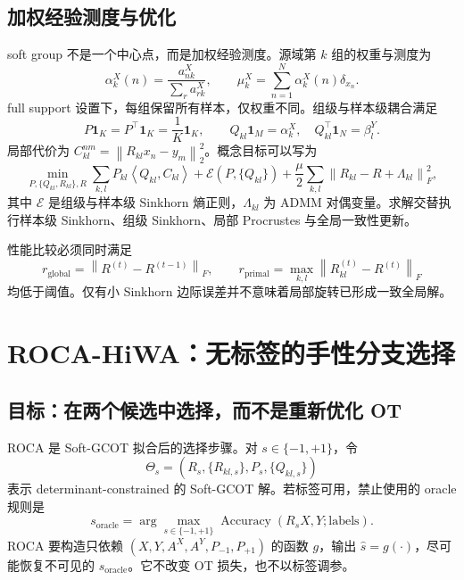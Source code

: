 \documentclass[UTF8,a4paper,11pt]{ctexart}
\newcommand{\norm}[1]{\left\lVert #1\right\rVert}
\newcommand{\inner}[2]{\left\langle #1,#2\right\rangle}
\begin{document}
\subsection{加权经验测度与优化}
soft group 不是一个中心点，而是加权经验测度。源域第 $k$ 组的权重与测度为
\begin{equation}
\alpha_k^X(n)=\frac{a_{nk}^X}{\sum_r a_{rk}^X},\qquad
\mu_k^X=\sum_{n=1}^{N}\alpha_k^X(n)\delta_{x_n}.
\end{equation}
full support 设置下，每组保留所有样本，仅权重不同。组级与样本级耦合满足
\begin{equation}
P\bm{1}_K=P^\top\bm{1}_K=\frac1K\bm{1}_K,\qquad
Q_{kl}\bm{1}_M=\alpha_k^X,\quad Q_{kl}^\top\bm{1}_N=\beta_l^Y.
\end{equation}
局部代价为 $C_{kl}^{nm}=\norm{R_{kl}x_n-y_m}_2^2$。概念目标可以写为
\begin{equation}
\min_{P,\{Q_{kl},R_{kl}\},R}
\sum_{k,l}P_{kl}\inner{Q_{kl}}{C_{kl}}+\mathcal E(P,\{Q_{kl}\})
+\frac{\mu}{2}\sum_{k,l}\norm{R_{kl}-R+\Lambda_{kl}}_F^2,
\end{equation}
其中 $\mathcal E$ 是组级与样本级 Sinkhorn 熵正则，$\Lambda_{kl}$ 为 ADMM 对偶变量。求解交替执行样本级 Sinkhorn、组级 Sinkhorn、局部 Procrustes 与全局一致性更新。

性能比较必须同时满足
\begin{equation}
r_{\mathrm{global}}=\norm{R^{(t)}-R^{(t-1)}}_F,\qquad
r_{\mathrm{primal}}=\max_{k,l}\norm{R_{kl}^{(t)}-R^{(t)}}_F
\end{equation}
均低于阈值。仅有小 Sinkhorn 边际误差并不意味着局部旋转已形成一致全局解。

\section{ROCA-HiWA：无标签的手性分支选择}
\subsection{目标：在两个候选中选择，而不是重新优化 OT}
ROCA 是 Soft-GCOT 拟合后的选择步骤。对 $s\in\{-1,+1\}$，令
\begin{equation}
\Theta_s=(R_s,\{R_{kl,s}\},P_s,\{Q_{kl,s}\})
\end{equation}
表示 determinant-constrained 的 Soft-GCOT 解。若标签可用，禁止使用的 oracle 规则是
\begin{equation}
s_{\mathrm{oracle}}=\arg\max_{s\in\{-1,+1\}}\operatorname{Accuracy}(R_sX,Y;\text{labels}).
\end{equation}
ROCA 要构造只依赖 $(X,Y,A^X,A^Y,P_{-1},P_{+1})$ 的函数 $g$，输出 $\hat s=g(\cdot)$，尽可能恢复不可见的 $s_{\mathrm{oracle}}$。它不改变 OT 损失，也不以标签调参。
\end{document}
